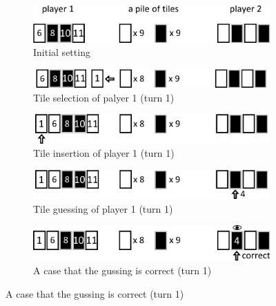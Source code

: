 \documentclass[conference]{IEEEtran}
\begin{document}
\begin{figure}
\begin{subfigure}[b]{0.95\columnwidth}
\includegraphics[width=0.95\columnwidth]{figures/DVC_procedure_1.pdf}
\caption{Initial setting}
\label{fig:DVC_procedure_1}
\end{subfigure}
\par\smallskip
\begin{subfigure}[b]{0.95\columnwidth}
\includegraphics[width=0.95\columnwidth]{figures/DVC_procedure_2.pdf}
\caption{Tile selection of palyer 1 (turn 1)}
\label{fig:DVC_procedure_2}
\end{subfigure}
\par\smallskip
\begin{subfigure}[b]{0.95\columnwidth}
\includegraphics[width=0.95\columnwidth]{figures/DVC_procedure_3.pdf}
\caption{Tile insertion of player 1 (turn 1)}
\label{fig:DVC_procedure_3}
\end{subfigure}
\par\smallskip
\begin{subfigure}[b]{0.95\columnwidth}
\includegraphics[width=0.95\columnwidth]{figures/DVC_procedure_4.pdf}
\caption{Tile guessing of player 1 (turn 1)}
\label{fig:DVC_procedure_4}
\end{subfigure}
\par\smallskip
\begin{subfigure}[b]{0.95\columnwidth}
\includegraphics[width=0.95\columnwidth]{figures/DVC_procedure_5.pdf}
\caption{A case that the gussing is correct (turn 1)}

\end{subfigure}
\end{figure}
\end{document}
